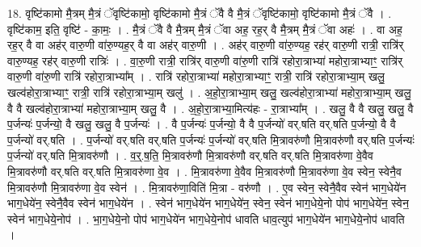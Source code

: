 \documentclass[17pt]{extarticle}
\begin{document}
18. वृष्टि॑कामो मै॒त्रम् मै॒त्रं ॅवृष्टि॑कामो॒ वृष्टि॑कामो मै॒त्रं ॅवै वै मै॒त्रं ॅवृष्टि॑कामो॒ वृष्टि॑कामो मै॒त्रं ॅवै । . वृष्टि॑काम॒ इति॒ वृष्टि॑ - का॒मः॒ । . मै॒त्रं ॅवै वै मै॒त्रम् मै॒त्रं ॅवा अह॒ रह॒र् वै मै॒त्रम् मै॒त्रं ॅवा अहः॑ । . वा अह॒ रह॒र् वै वा अह॑र् वारु॒णी वा॑रु॒ण्यह॒र् वै वा अह॑र् वारु॒णी । . अह॑र् वारु॒णी वा॑रु॒ण्यह॒ रह॑र् वारु॒णी रात्री॒ रात्रि॑र् वारु॒ण्यह॒ रह॑र् वारु॒णी रात्रिः॑ । . वा॒रु॒णी रात्री॒ रात्रि॑र् वारु॒णी वा॑रु॒णी रात्रि॑ रहोरा॒त्राभ्या॑ महोरा॒त्राभ्याꣳ॒॒ रात्रि॑र् वारु॒णी वा॑रु॒णी रात्रि॑ रहोरा॒त्राभ्या᳚म् । . रात्रि॑ रहोरा॒त्राभ्या॑ महोरा॒त्राभ्याꣳ॒॒ रात्री॒ रात्रि॑ रहोरा॒त्राभ्या॒म् खलु॒ खल्व॑होरा॒त्राभ्याꣳ॒॒ रात्री॒ रात्रि॑ रहोरा॒त्राभ्या॒म् खलु॑ । . अ॒हो॒रा॒त्राभ्या॒म् खलु॒ खल्व॑होरा॒त्राभ्या॑ महोरा॒त्राभ्या॒म् खलु॒ वै वै खल्व॑होरा॒त्राभ्या॑ महोरा॒त्राभ्या॒म् खलु॒ वै । . अ॒हो॒रा॒त्राभ्या॒मित्य॑हः - रा॒त्राभ्या᳚म् । . खलु॒ वै वै खलु॒ खलु॒ वै प॒र्जन्यः॑ प॒र्जन्यो॒ वै खलु॒ खलु॒ वै प॒र्जन्यः॑ । . वै प॒र्जन्यः॑ प॒र्जन्यो॒ वै वै प॒र्जन्यो॑ वर्.षति वर्.षति प॒र्जन्यो॒ वै वै प॒र्जन्यो॑ वर्.षति । . प॒र्जन्यो॑ वर्.षति वर्.षति प॒र्जन्यः॑ प॒र्जन्यो॑ वर्.षति मि॒त्रावरु॑णौ मि॒त्रावरु॑णौ वर्.षति प॒र्जन्यः॑ प॒र्जन्यो॑ वर्.षति मि॒त्रावरु॑णौ । . व॒र्॒.ष॒ति॒ मि॒त्रावरु॑णौ मि॒त्रावरु॑णौ वर्.षति वर्.षति मि॒त्रावरु॑णा वे॒वैव मि॒त्रावरु॑णौ वर्.षति वर्.षति मि॒त्रावरु॑णा वे॒व । . मि॒त्रावरु॑णा वे॒वैव मि॒त्रावरु॑णौ मि॒त्रावरु॑णा वे॒व स्वेन॒ स्वेनै॒व मि॒त्रावरु॑णौ मि॒त्रावरु॑णा वे॒व स्वेन॑ । . मि॒त्रावरु॑णा॒विति॑ मि॒त्रा - वरु॑णौ । . ए॒व स्वेन॒ स्वेनै॒वैव स्वेन॑ भाग॒धेये॑न भाग॒धेये॑न॒ स्वेनै॒वैव स्वेन॑ भाग॒धेये॑न । . स्वेन॑ भाग॒धेये॑न भाग॒धेये॑न॒ स्वेन॒ स्वेन॑ भाग॒धेये॒नो पोप॑ भाग॒धेये॑न॒ स्वेन॒ स्वेन॑ भाग॒धेये॒नोप॑ । . भा॒ग॒धेये॒नो पोप॑ भाग॒धेये॑न भाग॒धेये॒नोप॑ धावति धाव॒त्युप॑ भाग॒धेये॑न भाग॒धेये॒नोप॑ धावति । \newline
\end{document}
